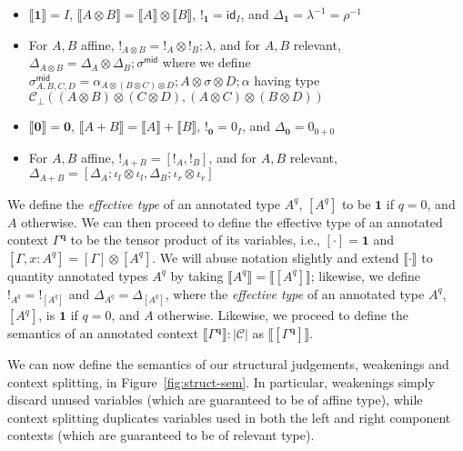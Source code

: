 \documentclass[acmsmall,screen,review]{acmart}
\newcommand{\mc}[1]{\ensuremath{\mathcal{#1}}}
\newcommand{\mb}[1]{\ensuremath{\mathbf{#1}}}
\newcommand{\ms}[1]{\ensuremath{\mathsf{#1}}}
\newcommand{\etoty}[1]{[#1]}
\newcommand{\dnt}[1]{\llbracket{#1}\rrbracket}
\newcommand{\dmor}[1]{{\Delta}_{#1}}
\newcommand{\subiterexp}{\texorpdfstring{\(\lambda_{\ms{iter}}\)}{lambda-iter}}
\begin{document}
\begin{definition}[\subiterexp-model]
\begin{itemize}
    \item $\dnt{\mb{1}} = I$, $\dnt{A \otimes B} = \dnt{A} \otimes \dnt{B}$, 
          $!_{\mb{1}} = \ms{id}_I$, and $\Delta_{\mb{1}} = \lambda^{-1} = \rho^{-1}$
    \item For $A, B$ affine, $!_{A \otimes B} = !_A \otimes !_B ; \lambda$, and for $A, B$ relevant, 
    $\Delta_{A \otimes B} 
      = \dmor{A} \otimes \dmor{B}
      ; \sigma^{\ms{mid}}
    $
    where we define
    $
    \sigma^{\ms{mid}}_{A, B, C, D} = 
      \alpha_{A \otimes (B \otimes C) \otimes D}
      ; A \otimes \sigma \otimes D
      ; \alpha
    $
    having type $\mc{C}_\bot(
        (A \otimes B) \otimes (C \otimes D), 
        (A \otimes C) \otimes (B \otimes D)
      )
    $
    \item $\dnt{\mb{0}} = \mb{0}$, $\dnt{A + B} = \dnt{A} + \dnt{B}$, 
          $!_{\mb{0}} = 0_{I}$, and $\Delta_{\mb{0}} = 0_{0 + 0}$
    \item For $A, B$ affine, $!_{A + B} = [!_A, !_B]$, and for $A, B$ relevant, 
    $\Delta_{A + B} 
      = [\dmor{A} ; \iota_l \otimes \iota_l, \dmor{B} ; \iota_r \otimes \iota_r]
    $
  \end{itemize}
\end{definition}
We define the \emph{effective type} of an annotated type $A^q$, $\etoty{A^q}$ to be $\mb{1}$ if
$q = 0$, and $A$ otherwise. We can then proceed to define the effective type of an annotated context
$\Gamma^{\mb{q}}$ to be the tensor product of its variables, i.e., $\etoty{\cdot} = \mb{1}$ and
$\etoty{\Gamma, x : A^q} = \etoty{\Gamma} \otimes \etoty{A^q}$. 
We will abuse notation slightly and extend $\dnt{\cdot}$ to quantity 
annotated types $A^q$ by taking $\dnt{A^q} = \dnt{\etoty{A^q}}$; likewise, we define $!_{A^q} =
!_{\etoty{A^q}}$ and $\Delta_{A^q} = \Delta_{\etoty{A^q}}$, where the \emph{effective type} of an 
annotated type $A^q$, $\etoty{A^q}$, is $\mb{1}$ if $q = 0$, and $A$ otherwise. 
Likewise, we proceed to define the semantics of an annotated context 
$\dnt{\Gamma^{\mb{q}}} : |\mc{C}|$ as $\dnt{\etoty{\Gamma^{\mb{q}}}}$.

We can now define the semantics of our structural judgements, weakenings and context splitting, in
Figure~\ref{fig:struct-sem}. In particular, weakenings simply discard unused variables (which are
guaranteed to be of affine type), while context splitting duplicates variables used in both the left
and right component contexts (which are guaranteed to be of relevant type).
\end{document}
